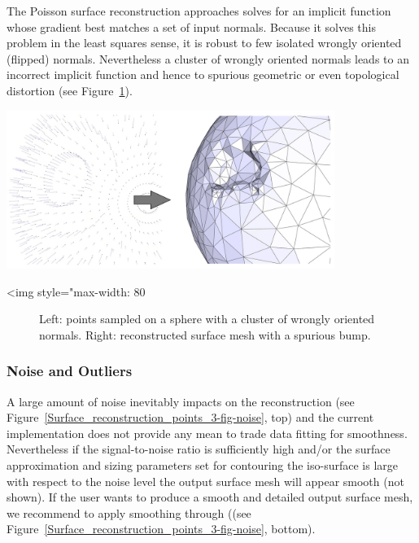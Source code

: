 The Poisson surface reconstruction approaches solves for an implicit function whose gradient best matches a set of input normals. Because it solves this problem in the least squares sense, it is robust to few isolated wrongly oriented (flipped) normals. Nevertheless a cluster of wrongly oriented normals leads to an incorrect implicit function and hence to spurious geometric or even topological distortion (see Figure~\ref{Surface_reconstruction_points_3-fig-flipped_normals}).

\begin{center}
    \begin{ccTexOnly}
        \includegraphics[width=0.8\textwidth]{Surface_reconstruction_points_3/flipped_normals}
    \end{ccTexOnly}
    \begin{ccHtmlOnly}
        <img style="max-width: 80%
    \end{ccHtmlOnly}
    \begin{figure}[h]
        \caption{Left: points sampled on a sphere with a cluster
                 of wrongly oriented normals.
                 Right: reconstructed surface mesh with a spurious bump.}
        \label{Surface_reconstruction_points_3-fig-flipped_normals}
    \end{figure}
\end{center}


\subsubsection{Noise and Outliers}

A large amount of noise inevitably impacts on the reconstruction (see Figure~\ref{Surface_reconstruction_points_3-fig-noise}, top) and the current implementation does not provide any mean to trade data fitting for smoothness. Nevertheless if the signal-to-noise ratio is sufficiently high and/or the
surface approximation and sizing parameters set for contouring the iso-surface is large with respect to the noise level the output surface mesh will appear smooth (not shown). If the user wants to produce a smooth and detailed output surface mesh, we recommend to apply smoothing through  ((see Figure~\ref{Surface_reconstruction_points_3-fig-noise}, bottom).

